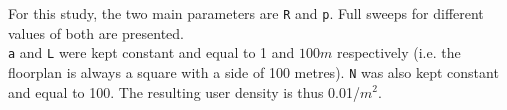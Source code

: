 \hfill \break
For this study, the two main parameters are
\colorbox{gray!30}{\large \texttt{R}} and \colorbox{gray!30}{\large \texttt{p}}.
Full sweeps for different values of both are presented.\\
\colorbox{gray!30}{\large \texttt{a}} and \colorbox{gray!30}{\large \texttt{L}}
were kept constant and equal to 1 and $100 m$ respectively (i.e. the floorplan
is always a square with a side of 100 metres).
\colorbox{gray!30}{\large \texttt{N}} was also kept constant and equal to 100.
The resulting user density is thus 0.01/$m^{2}$.
